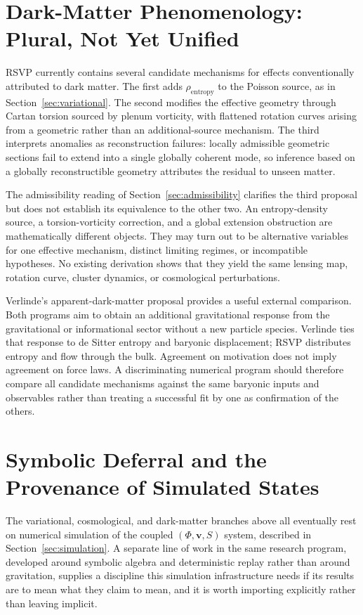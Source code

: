 \documentclass[11pt]{article}
\begin{document}
\section{Dark-Matter Phenomenology: Plural, Not Yet Unified}
\label{sec:darkmatter}

RSVP currently contains several candidate mechanisms for effects conventionally attributed to dark matter. The first adds $\rho_{\mathrm{entropy}}$ to the Poisson source, as in Section~\ref{sec:variational}. The second modifies the effective geometry through Cartan torsion sourced by plenum vorticity, with flattened rotation curves arising from a geometric rather than an additional-source mechanism. The third interprets anomalies as reconstruction failures: locally admissible geometric sections fail to extend into a single globally coherent mode, so inference based on a globally reconstructible geometry attributes the residual to unseen matter.

The admissibility reading of Section~\ref{sec:admissibility} clarifies the third proposal but does not establish its equivalence to the other two. An entropy-density source, a torsion-vorticity correction, and a global extension obstruction are mathematically different objects. They may turn out to be alternative variables for one effective mechanism, distinct limiting regimes, or incompatible hypotheses. No existing derivation shows that they yield the same lensing map, rotation curve, cluster dynamics, or cosmological perturbations.

Verlinde's apparent-dark-matter proposal provides a useful external comparison. Both programs aim to obtain an additional gravitational response from the gravitational or informational sector without a new particle species. Verlinde ties that response to de Sitter entropy and baryonic displacement; RSVP distributes entropy and flow through the bulk. Agreement on motivation does not imply agreement on force laws. A discriminating numerical program should therefore compare all candidate mechanisms against the same baryonic inputs and observables rather than treating a successful fit by one as confirmation of the others.

\section{Symbolic Deferral and the Provenance of Simulated States}
\label{sec:provenance}

The variational, cosmological, and dark-matter branches above all eventually rest on numerical simulation of the coupled $(\Phi,\mathbf{v},S)$ system, described in Section~\ref{sec:simulation}. A separate line of work in the same research program, developed around symbolic algebra and deterministic replay rather than around gravitation, supplies a discipline this simulation infrastructure needs if its results are to mean what they claim to mean, and it is worth importing explicitly rather than leaving implicit.
\end{document}
